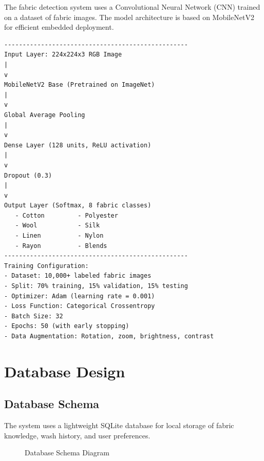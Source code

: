 The fabric detection system uses a Convolutional Neural Network (CNN) trained on a dataset of fabric images. The model architecture is based on MobileNetV2 for efficient embedded deployment.

\begin{verbatim}
--------------------------------------------------
Input Layer: 224x224x3 RGB Image
|
v
MobileNetV2 Base (Pretrained on ImageNet)
|
v
Global Average Pooling
|
v
Dense Layer (128 units, ReLU activation)
|
v
Dropout (0.3)
|
v
Output Layer (Softmax, 8 fabric classes)
   - Cotton         - Polyester
   - Wool           - Silk
   - Linen          - Nylon
   - Rayon          - Blends
--------------------------------------------------
Training Configuration:
- Dataset: 10,000+ labeled fabric images
- Split: 70% training, 15% validation, 15% testing
- Optimizer: Adam (learning rate = 0.001)
- Loss Function: Categorical Crossentropy
- Batch Size: 32
- Epochs: 50 (with early stopping)
- Data Augmentation: Rotation, zoom, brightness, contrast
\end{verbatim}

\section{Database Design}

\subsection{Database Schema}

The system uses a lightweight SQLite database for local storage of fabric knowledge, wash history, and user preferences.

\begin{figure}[H]
\centering
{}
\caption{Database Schema Diagram}
\label{fig:db}
\end{figure}

